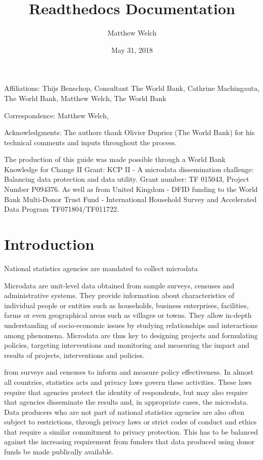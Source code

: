 \documentclass[letterpaper,10pt,english]{sphinxmanual}
\title{Readthedocs Documentation}
\date{May 31, 2018}
\author{Matthew Welch}
\begin{document}
\maketitle
\sphinxtableofcontents
{}\label{\detokenize{index::doc}}





Affiliations: Thijs Benschop, Consultant The World Bank, Cathrine
Machingauta, The World Bank, Matthew Welch, The World Bank

Correspondence: Matthew Welch, 

Acknowledgments: The authors thank Olivier Dupriez (The World Bank) for
his technical comments and inputs throughout the process.

The production of this guide was made possible through a World Bank
Knowledge for Change II Grant: KCP II - A microdata dissemination
challenge: Balancing data protection and data utility. Grant number: TF
015043, Project Number P094376. As well as from United Kingdom - DFID
funding to the World Bank Multi-Donor Trust Fund - International
Household Survey and Accelerated Data Program \textendash{} TF071804/TF011722.


\chapter{Introduction}
\label{\detokenize{intro:statistical-disclosure-control-for-microdata-a-practice-guide}}\label{\detokenize{intro:introduction}}\label{\detokenize{intro::doc}}
National statistics agencies are mandated to collect
microdata %
\begin{footnote}[1]\sphinxAtStartFootnote
Microdata are unit-level data obtained from sample surveys, censuses
and administrative systems. They provide information about
characteristics of individual people or entities such as households,
business enterprises, facilities, farms or even geographical areas
such as villages or towns. They allow in-depth understanding of
socio-economic issues by studying relationships and interactions
among phenomena. Microdata are thus key to designing projects and
formulating policies, targeting interventions and monitoring and
measuring the impact and results of projects, interventions and
policies.
%
\end{footnote} from surveys and censuses to inform and
measure policy effectiveness. In almost all countries, statistics acts
and privacy laws govern these activities. These laws require that
agencies protect the identity of respondents, but may also require that
agencies disseminate the results and, in appropriate cases, the
microdata. Data producers who are not part of national statistics
agencies are also often subject to restrictions, through privacy laws or
strict codes of conduct and ethics that require a similar commitment to
privacy protection. This has to be balanced against the increasing
requirement from funders that data produced using donor funds be made
publically available.
\end{document}
